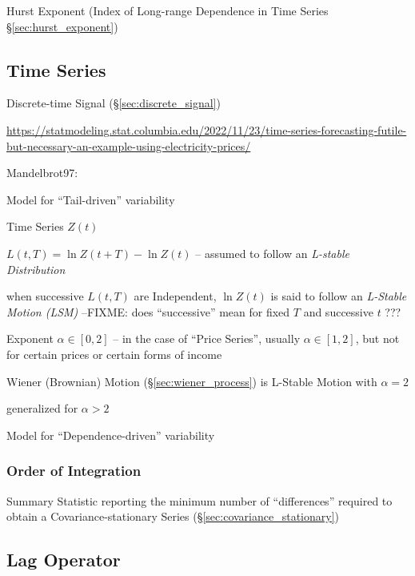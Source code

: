 Hurst Exponent (Index of Long-range Dependence in Time Series
\S\ref{sec:hurst_exponent})



\subsection{Time Series}\label{sec:time_series}

Discrete-time Signal (\S\ref{sec:discrete_signal})

\url{https://statmodeling.stat.columbia.edu/2022/11/23/time-series-forecasting-futile-but-necessary-an-example-using-electricity-prices/}

Mandelbrot97:


Model for ``Tail-driven'' variability

Time Series $Z(t)$

$L(t, T) = \ln Z(t+T) - \ln Z(t)$ -- assumed to follow an \emph{L-stable
  Distribution}

when successive $L(t, T)$ are Independent, $\ln Z(t)$ is said to follow an
\emph{L-Stable Motion (LSM)} --FIXME: does ``successive'' mean for fixed $T$ and
successive $t$ ???

Exponent $\alpha \in [0, 2]$ -- in the case of ``Price Series'', usually
$\alpha \in [1, 2]$, but not for certain prices or certain forms of income

Wiener (Brownian) Motion (\S\ref{sec:wiener_process}) is L-Stable Motion with
$\alpha = 2$

generalized for $\alpha > 2$

Model for ``Dependence-driven'' variability



\subsubsection{Order of Integration}\label{sec:order_of_integration}

Summary Statistic reporting the minimum number of ``differences'' required to
obtain a Covariance-stationary Series (\S\ref{sec:covariance_stationary})



\subsection{Lag Operator}\label{sec:lag_operator}

